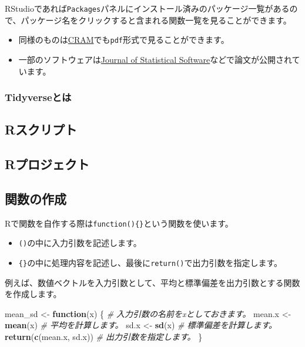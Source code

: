 \documentclass[]{bxjsarticle}
\newenvironment{Shaded}{\begin{snugshade}}{\end{snugshade}}
\newcommand{\CommentTok}[1]{\textcolor[rgb]{0.56,0.35,0.01}{\textit{#1}}}
\newcommand{\ControlFlowTok}[1]{\textcolor[rgb]{0.13,0.29,0.53}{\textbf{#1}}}
\newcommand{\KeywordTok}[1]{\textcolor[rgb]{0.13,0.29,0.53}{\textbf{#1}}}
\newcommand{\NormalTok}[1]{#1}
\newcommand{\StringTok}[1]{\textcolor[rgb]{0.31,0.60,0.02}{#1}}
\providecommand{\tightlist}{%
  \setlength{\itemsep}{0pt}\setlength{\parskip}{0pt}}
\begin{document}
RStudioであれば\texttt{Packages}パネルにインストール済みのパッケージ一覧があるので、パッケージ名をクリックすると含まれる関数一覧を見ることができます。

\begin{itemize}
\tightlist
\item
  同様のものは\href{https://cran.r-project.org/}{CRAM}でも\texttt{pdf}形式で見ることができます。
\item
  一部のソフトウェアは\href{https://www.jstatsoft.org/index}{Journal of Statistical Software}などで論文が公開されています。
\end{itemize}

\hypertarget{tidyverseux3068ux306f}{%
\subsubsection{Tidyverseとは}\label{tidyverseux3068ux306f}}

\hypertarget{rux30b9ux30afux30eaux30d7ux30c8}{%
\subsection{Rスクリプト}\label{rux30b9ux30afux30eaux30d7ux30c8}}

\hypertarget{rux30d7ux30edux30b8ux30a7ux30afux30c8}{%
\subsection{Rプロジェクト}\label{rux30d7ux30edux30b8ux30a7ux30afux30c8}}

\hypertarget{ux95a2ux6570ux306eux4f5cux6210}{%
\subsection{関数の作成}\label{ux95a2ux6570ux306eux4f5cux6210}}

Rで関数を自作する際は\texttt{function()\{\}}という関数を使います。

\begin{itemize}
\tightlist
\item
  \texttt{()}の中に入力引数を記述します。
\item
  \texttt{\{\}}の中に処理内容を記述し、最後に\texttt{return()}で出力引数を指定します。
\end{itemize}

例えば、数値ベクトルを入力引数として、平均と標準偏差を出力引数とする関数を作成します。

\begin{Shaded}
\begin{Highlighting}[]
\NormalTok{mean_sd <-}\StringTok{ }\ControlFlowTok{function}\NormalTok{(x) \{ }\CommentTok{# 入力引数の名前をxとしておきます。}
\NormalTok{  mean.x <-}\StringTok{ }\KeywordTok{mean}\NormalTok{(x) }\CommentTok{# 平均を計算します。}
\NormalTok{  sd.x <-}\StringTok{ }\KeywordTok{sd}\NormalTok{(x) }\CommentTok{# 標準偏差を計算します。}
  \KeywordTok{return}\NormalTok{(}\KeywordTok{c}\NormalTok{(mean.x, sd.x)) }\CommentTok{# 出力引数を指定します。}
\NormalTok{\}}
\end{Highlighting}
\end{Shaded}
\end{document}

